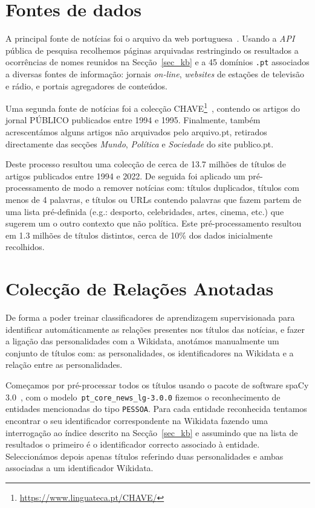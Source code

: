 \documentclass[a4paper, twocolumn, 11pt, twoside]{article}
\begin{document}
\section{Fontes de dados}
\label{sec:data_sources}

A principal fonte de notícias foi o arquivo da web portuguesa~\citep{SearchPastPWA2013}. Usando a \textit{API} pública de pesquisa recolhemos páginas arquivadas restringindo os resultados a ocorrências de nomes reunidos na Secção~\ref{sec_kb} e a 45 domínios \texttt{.pt} associados a diversas fontes de informação: jornais \textit{on-line}, \textit{websites} de estações de televisão e rádio, e portais agregadores de conteúdos. 

Uma segunda fonte de notícias foi a colecção CHAVE\footnote{\url{https://www.linguateca.pt/CHAVE/}}~\citep{DBLP:conf/clef/SantosR04, santos-rocha-2001-evaluating}, contendo os artigos do jornal PÚBLICO publicados entre 1994 e 1995. Finalmente, também acrescentámos alguns artigos não arquivados pelo arquivo.pt, retirados directamente das secções {\it Mundo}, {\it Política} e {\it Sociedade} do site publico.pt. 

Deste processo resultou uma colecção de cerca de 13.7 milhões de títulos de artigos publicados entre 1994 e 2022. De seguida foi aplicado um pré-processamento de modo a remover notícias com: títulos duplicados, títulos com menos de 4 palavras, e títulos ou URLs contendo palavras que fazem partem de uma lista pré-definida (e.g.: desporto, celebridades, artes, cinema, etc.) que sugerem um o outro contexto que não política. Este pré-processamento resultou em 1.3 milhões de títulos distintos, cerca de 10\% dos dados inicialmente recolhidos.

\section{Colecção de Relações Anotadas}
\label{sec:rel_data_annot}

De forma a poder treinar classificadores de aprendizagem supervisionada para identificar automáticamente as relações presentes nos títulos das notícias, e fazer a ligação das personalidades com a Wikidata, anotámos manualmente um conjunto de títulos com: as personalidades, os identificadores na Wikidata e a relação entre as personalidades.

Começamos por pré-processar todos os títulos usando o pacote de software spaCy 3.0~\citep{spacy}, com o modelo~\texttt{pt\_core\_news\_lg-3.0.0} fizemos o reconhecimento de entidades mencionadas do tipo \texttt{PESSOA}. Para cada entidade reconhecida tentamos encontrar o seu identificador correspondente na Wikidata fazendo uma interrogação ao índice descrito na Secção~\ref{sec_kb} e assumindo que na lista de resultados o primeiro é o identificador correcto associado à entidade. Seleccionámos depois apenas títulos referindo duas personalidades e ambas associadas a um identificador Wikidata.
\end{document}
